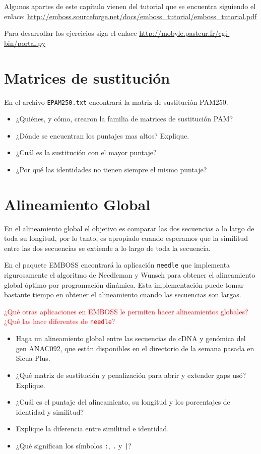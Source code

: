 \documentclass[letter,11pt]{book}
\begin{document}
Algunos apartes de este capítulo vienen del tutorial que se encuentra siguiendo el enlace: \url{http://emboss.sourceforge.net/docs/emboss_tutorial/emboss_tutorial.pdf}

Para desarrollar los ejercicios siga el enlace \url{http://mobyle.pasteur.fr/cgi-bin/portal.py}

\section{Matrices de sustitución}

En el archivo \Verb+EPAM250.txt+ encontrará la matriz de sustitución PAM250.


{
\color{red}
\begin{itemize}
\item ¿Quiénes, y cómo, crearon la familia de matrices de sustitución PAM?
\item ¿Dónde se encuentran los puntajes mas altos? Explique.
\item ¿Cuál es la sustitución con el mayor puntaje?
\item ¿Por qué las identidades  no tienen siempre el mismo puntaje?
\end{itemize}

}


\section{Alineamiento Global}

En el alineamiento global el objetivo es comparar las dos secuencias a lo largo de toda su longitud, por lo tanto, es apropiado cuando esperamos que la similitud entre las dos secuencias se extiende a lo largo de toda la secuencia.

En el paquete EMBOSS encontrará la aplicación \Verb+needle+ que implementa rigurosamente el algoritmo de  Needleman y Wunsch \citep{Needleman1970} para obtener el alineamiento global óptimo por programación dinámica. Esta implementación puede tomar bastante tiempo en obtener el alineamiento cuando las secuencias son largas.

\textcolor{red}{¿Qué otras aplicaciones en EMBOSS le permiten hacer alineamientos globales? ¿Qué las hace diferentes de \Verb+needle+?}

{\color{red}
\begin{itemize}
\item Haga un alineamiento global entre las secuencias de cDNA y genómica del gen ANAC092, que están disponibles en el directorio de la semana pasada en Sicua Plus.
\item ¿Qué matriz de sustitución y penalización para abrir y extender gaps usó? Explique.
\item ¿Cuál es el puntaje del alineamiento, su longitud y los porcentajes de identidad y similitud?
\item Explique la diferencia entre similitud e identidad.
\item ¿Qué significan los símbolos  \Verb+:+, \Verb+.+ y \Verb+|+?
\end{itemize}
}
\end{document}
